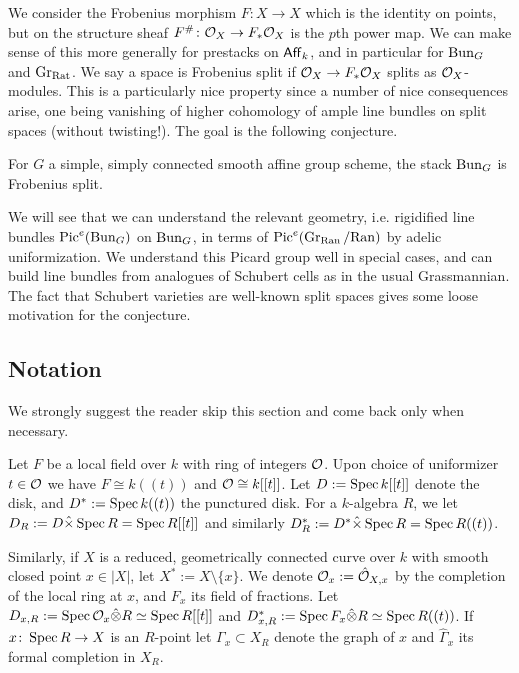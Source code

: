 \documentclass[12pt]{article}
\begin{document}
We consider the Frobenius morphism $F \colon X \to X$ which is the identity on points, but on the structure sheaf $F^{\#}\colon \mathcal{O}_X \to F_* \mathcal{O}_X$ is the $p$th power map. We can make sense of this more generally for prestacks on $\operatorname{\mathsf{Aff}}_k$, and in particular for $\operatorname{Bun}_G$ and $\operatorname{Gr}_{\mathrm{Rat}}$. We say a space is Frobenius split if $\mathcal{O}_X \to F_* \mathcal{O}_X$ splits as $\mathcal{O}_X$-modules. This is a particularly nice property since a number of nice consequences arise, one being vanishing of higher cohomology of ample line bundles on split spaces (without twisting!). The goal is the following conjecture.
\begin{conj}
    For $G$ a simple, simply connected smooth affine group scheme, the stack $\operatorname{Bun}_G$ is Frobenius split.
\end{conj}
We will see that we can understand the relevant geometry, i.e. rigidified line bundles $\operatorname{Pic}^e(\operatorname{Bun}_G)$ on $\operatorname{Bun}_G$, in terms of $\operatorname{Pic}^e(\operatorname{Gr}_{\mathrm{Ran}}/\mathrm{Ran})$ by adelic uniformization. We understand this Picard group well in special cases, and can build line bundles from analogues of Schubert cells as in the usual Grassmannian. The fact that Schubert varieties are well-known split spaces gives some loose motivation for the conjecture.

\subsection{Notation}

We strongly suggest the reader skip this section and come back only when necessary.

Let $F$ be a local field over $k$ with ring of integers $\mathcal{O}$. Upon choice of uniformizer $t \in \mathcal{O}$ we have $F \cong k((t))$ and $\mathcal{O} \cong k[[t]]$. Let $D := \operatorname{Spec} k[[t]]$ denote the disk, and $D^* := \operatorname{Spec} k((t))$ the punctured disk. For a $k$-algebra $R$, we let $D_R := D \hat{\times} \operatorname{Spec} R = \operatorname{Spec} R[[t]]$ and similarly $D^*_R := D^* \hat{\times} \operatorname{Spec} R = \operatorname{Spec} R((t))$. 

Similarly, if $X$ is a reduced, geometrically connected curve over $k$ with smooth closed point $x \in |X|$, let $X^* := X \setminus \{x\}$. We denote $\mathcal{O}_x := \hat{\mathcal{O}}_{X,x}$ by the completion of the local ring at $x$, and $F_x$ its field of fractions. Let $D_{x,R} := \operatorname{Spec} \mathcal{O}_x \hat{\otimes} R \simeq \operatorname{Spec} R[[t]]$ and $D_{x,R}^* := \operatorname{Spec} F_x \hat{\otimes} R \simeq \operatorname{Spec} R((t))$. If $x \colon \operatorname{Spec} R \to X$ is an $R$-point let $\Gamma_x \subset X_R$ denote the graph of $x$ and $\hat{\Gamma}_x$ its formal completion in $X_R$.
\end{document}
